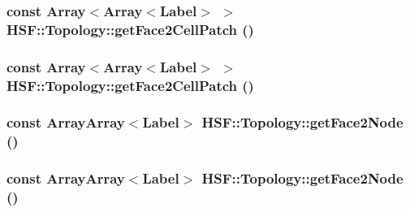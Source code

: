 \label{classHSF_1_1Topology_a89d020dbaa3624a7b01d10e0c3249f28}
\hypertarget{classHSF_1_1Topology_a89d020dbaa3624a7b01d10e0c3249f28}{
\subsubsection[{getFace2CellPatch}]{\setlength{\rightskip}{0pt plus 5cm}const Array$<$Array$<${\bf Label}$>$ $>$ HSF::Topology::getFace2CellPatch ()}}
\label{classHSF_1_1Topology_a89d020dbaa3624a7b01d10e0c3249f28}
\hypertarget{classHSF_1_1Topology_a89d020dbaa3624a7b01d10e0c3249f28}{
\subsubsection[{getFace2CellPatch}]{\setlength{\rightskip}{0pt plus 5cm}const Array$<$Array$<${\bf Label}$>$ $>$ HSF::Topology::getFace2CellPatch ()}}
\label{classHSF_1_1Topology_a89d020dbaa3624a7b01d10e0c3249f28}
\hypertarget{classHSF_1_1Topology_a6e6fd144f43943e4cffbfda646441942}{
\subsubsection[{getFace2Node}]{\setlength{\rightskip}{0pt plus 5cm}const {\bf ArrayArray}$<${\bf Label}$>$ HSF::Topology::getFace2Node ()}}
\label{classHSF_1_1Topology_a6e6fd144f43943e4cffbfda646441942}
\hypertarget{classHSF_1_1Topology_a6e6fd144f43943e4cffbfda646441942}{
\subsubsection[{getFace2Node}]{\setlength{\rightskip}{0pt plus 5cm}const {\bf ArrayArray}$<${\bf Label}$>$ HSF::Topology::getFace2Node ()}}
